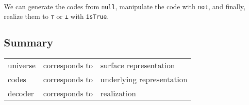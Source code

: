 \documentclass[\main/thesis.tex]{subfiles}
\begin{document}
We can generate the codes from \lstinline|null|,
manipulate the code with \lstinline|not|,
and finally, realize them to \lstinline|⊤| or \lstinline|⊥| with \lstinline|isTrue|.

\subsection{Summary}

\begin{center}
    \begin{adjustbox}{max width=\textwidth}
    \begin{tabular}{ l l l }
    universe & corresponds to & surface representation \\
    codes & corresponds to & underlying representation \\
    decoder & corresponds to & realization \\
    \end{tabular}
    \end{adjustbox}
\end{center}
\end{document}

